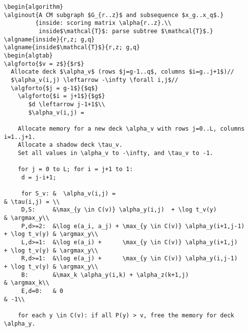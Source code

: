 \documentclass[11pt]{article}
\def\argmax{\mathop{\mathrm{argmax}}\limits}
\begin{document}
\begin{verbatim}
\begin{algorithm}
\alginout{A CM subgraph $G_{r..z}$ and subsequence $x_g..x_q$.}
         {inside: scoring matrix \alpha{r..z}.\\
          inside$\mathcal{T}$: parse subtree $\mathcal{T}$.}
\algname{inside}{r,z; g,q} 
\algname{inside$\mathcal{T}$}{r,z; g,q} 
\begin{algtab}
\algforto{$v = z$}{$r$}
  Allocate deck $\alpha_v$ (rows $j=g-1..q$, columns $i=g..j+1$)//
  $\alpha_v(i,j) \leftarrow -\infty \forall i,j$//
  \algforto{$j = g-1$}{$q$} 
    \algforto{$i = j+1$}{$g$}
       $d \leftarrow j-1+1$\\
       $\alpha_v(i,j) = 	

    Allocate memory for a new deck \alpha_v with rows j=0..L, columns i=1..j+1.
    Allocate a shadow deck \tau_v.
    Set all values in \alpha_v to -\infty, and \tau_v to -1.

    for j = 0 to L; for i = j+1 to 1:
     d = j-i+1;
     
     for S_v: &  \alpha_v(i,j) =                                                    & \tau(i,j) = \\
     D,S:     &\max_{y \in C(v)} \alpha_y(i,j)  + \log t_v(y)	                    & \argmax_y\\
     P,d>=2:  &\log e(a_i, a_j) + \max_{y \in C(v)} \alpha_y(i+1,j-1) + \log t_v(y) & \argmax_y\\
     L,d>=1:  &\log e(a_i) +      \max_{y \in C(v)} \alpha_y(i+1,j)   + \log t_v(y) & \argmax_y\\
     R,d>=1:  &\log e(a_j) +      \max_{y \in C(v)} \alpha_y(i,j-1)   + \log t_v(y) & \argmax_y\\
     B:       &\max_k \alpha_y(i,k) + \alpha_z(k+1,j)                               & \argmax_k\\
     E,d=0:   & 0                                                                   & -1\\

    for each y \in C(v): if all P(y) > v, free the memory for deck \alpha_y.
\end{verbatim}
\end{document}

